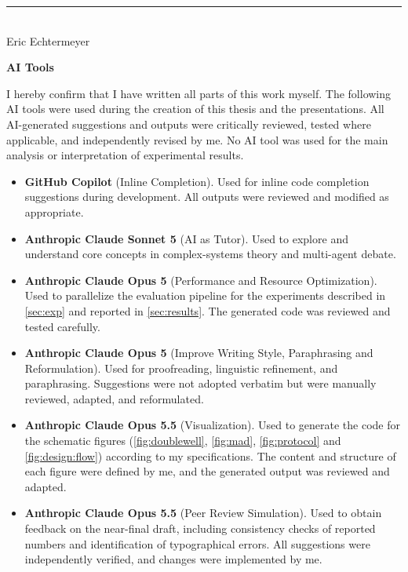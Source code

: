 \documentclass[12pt]{article}
\newcommand{\myname}{Eric Echtermeyer}
\begin{document}
\vspace{1cm}

\noindent\rule{0.5\textwidth}{0.4pt} \\

\myname

\newpage

\Large
\noindent
\textbf{AI Tools}
\vspace{0.3cm}
\noindent
\normalsize

I hereby confirm that I have written all parts of this work myself. The following AI tools were used during the creation of this thesis and the presentations. All AI-generated suggestions and outputs were critically reviewed, tested where applicable, and independently revised by me. No AI tool was used for the main analysis or interpretation of experimental results.

\vspace{0.3cm}

\begin{itemize}
    \item \textbf{GitHub Copilot} (Inline Completion). Used for inline code completion suggestions during development. All outputs were reviewed and modified as appropriate.
    \item \textbf{Anthropic Claude Sonnet 5} (AI as Tutor). Used to explore and understand core concepts in complex-systems theory and multi-agent debate.
    \item \textbf{Anthropic Claude Opus 5} (Performance and Resource Optimization). Used to parallelize the evaluation pipeline for the experiments described in \autoref{sec:exp} and reported in \autoref{sec:results}. The generated code was reviewed and tested carefully.
    \item \textbf{Anthropic Claude Opus 5} (Improve Writing Style, Paraphrasing and Reformulation). Used for proofreading, linguistic refinement, and paraphrasing. Suggestions were not adopted verbatim but were manually reviewed, adapted, and reformulated.
    \item \textbf{Anthropic Claude Opus 5.5} (Visualization). Used to generate the code for the schematic figures (\autoref{fig:doublewell}, \autoref{fig:mad}, \autoref{fig:protocol} and \autoref{fig:design:flow}) according to my specifications. The content and structure of each figure were defined by me, and the generated output was reviewed and adapted.
    \item \textbf{Anthropic Claude Opus 5.5} (Peer Review Simulation). Used to obtain feedback on the near-final draft, including consistency checks of reported numbers and identification of typographical errors. All suggestions were independently verified, and changes were implemented by me.
\end{itemize}
\end{document}
